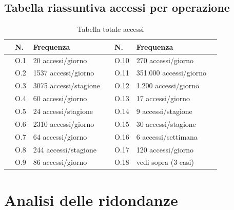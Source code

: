 \subsection{Tabella riassuntiva accessi per operazione}

\begin{table}[H]
  \centering
  \caption{Tabella totale accessi}
  \label{tab:accessi-completo}
  \begin{tabularx}{\textwidth}{C{1.1cm} C{0.6cm} C{4.3cm} C{1cm} C{0.6cm} C{4.3cm} C{1.15cm}}
  \toprule
  & \textbf{N.} & \textbf{Frequenza} & & \textbf{N.} & \textbf{Frequenza} & \\
  \midrule
   & O.1 & 20 accessi/giorno          & & O.10 & 270 accessi/giorno     & \\
   & O.2 & 1537 accessi/giorno        & & O.11 & 351.000 accessi/giorno & \\
   & O.3 & 3075 accessi/stagione      & & O.12 & 1.200 accessi/giorno   & \\
   & O.4 & 60 accessi/giorno          & & O.13 & 17 accessi/giorno      & \\
   & O.5 & 24 accessi/stagione        & & O.14 & 9 accessi/stagione     & \\
   & O.6 & 2310 accessi/giorno        & & O.15 & 30 accessi/stagione    & \\
   & O.7 & 64 accessi/giorno          & & O.16 & 6 accessi/settimana    & \\
   & O.8 & 244 accessi/stagione       & & O.17 & 120 accessi/giorno     & \\
   & O.9 & 86 accessi/giorno          & & O.18 & vedi sopra (3 casi)    & \\
  \bottomrule
  \end{tabularx}
\end{table}

\clearpage

\section{Analisi delle ridondanze}

